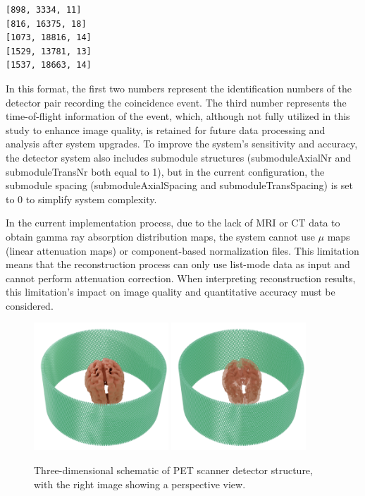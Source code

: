 \documentclass[
reprint,
superscriptaddress,
nofootinbib,
amsmath,amssymb,
aps,
prd,
]{revtex4-2}
\begin{document}
\begin{verbatim}
[898, 3334, 11]
[816, 16375, 18]
[1073, 18816, 14]
[1529, 13781, 13]
[1537, 18663, 14]
\end{verbatim}

In this format, the first two numbers represent the identification numbers of the detector pair recording the coincidence event. The third number represents the time-of-flight information of the event, which, although not fully utilized in this study to enhance image quality, is retained for future data processing and analysis after system upgrades. To improve the system's sensitivity and accuracy, the detector system also includes submodule structures (submoduleAxialNr and submoduleTransNr both equal to 1), but in the current configuration, the submodule spacing (submoduleAxialSpacing and submoduleTransSpacing) is set to 0 to simplify system complexity.

In the current implementation process, due to the lack of MRI or CT data to obtain gamma ray absorption distribution maps, the system cannot use $\mu$ maps (linear attenuation maps) or component-based normalization files. This limitation means that the reconstruction process can only use list-mode data as input and cannot perform attenuation correction. When interpreting reconstruction results, this limitation's impact on image quality and quantitative accuracy must be considered.

\begin{figure}[htbp]
\centering
\vspace{-0.2cm}
\includegraphics[width=0.45\textwidth]{Images/Thehumanbrainisnotmissing3}
\includegraphics[width=0.45\textwidth]{Images/Thehumanbrainisnotmissing4}
\vspace{-0.2cm}
\caption{Three-dimensional schematic of PET scanner detector structure, with the right image showing a perspective view.}
\vspace{-0.2cm}
\label{fig:pet_structures}
\end{figure}
\end{document}
